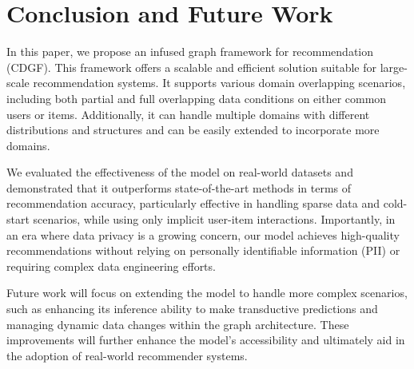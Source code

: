 \section{Conclusion and Future Work}
In this paper, we propose an infused graph framework for recommendation (CDGF). This framework offers a scalable and efficient solution suitable for large-scale recommendation systems. It supports various domain overlapping scenarios, including both partial and full overlapping data conditions on either common users or items. Additionally, it can handle multiple domains with different distributions and structures and can be easily extended to incorporate more domains.

We evaluated the effectiveness of the model on real-world datasets and demonstrated that it outperforms state-of-the-art methods in terms of recommendation accuracy, particularly effective in handling sparse data and cold-start scenarios, while using only implicit user-item interactions. Importantly, in an era where data privacy is a growing concern, our model achieves high-quality recommendations without relying on personally identifiable information (PII) or requiring complex data engineering efforts.

Future work will focus on extending the model to handle more complex scenarios, such as enhancing its inference ability to make transductive predictions and managing dynamic data changes within the graph architecture. These improvements will further enhance the model's accessibility and ultimately aid in the adoption of real-world recommender systems.
